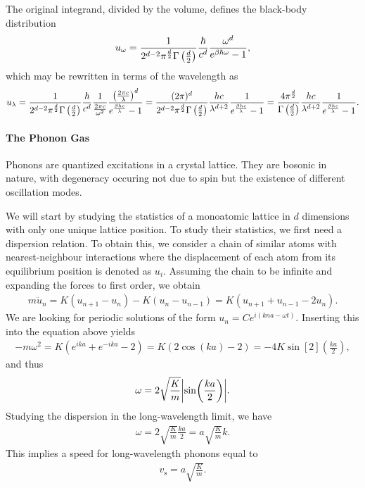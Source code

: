 The original integrand, divided by the volume, defines the black-body distribution
\begin{align*}
	u_{\omega} = \frac{1}{2^{d - 2}\pi^{\frac{d}{2}}\Gamma\left(\frac{d}{2}\right)}\frac{\hbar}{c^{d}}\frac{\omega^{d}}{e^{\beta\hbar\omega} - 1},
\end{align*}
which may be rewritten in terms of the wavelength as
\begin{align*}
	u_{\lambda} = \frac{1}{2^{d - 2}\pi^{\frac{d}{2}}\Gamma\left(\frac{d}{2}\right)}\frac{\hbar}{c^{d}}\frac{1}{\frac{2\pi c}{\omega^{2}}}\frac{\left(\frac{2\pi c}{\lambda}\right)^{d}}{e^{\frac{\beta hc}{\lambda}} - 1} = \frac{(2\pi)^{d}}{2^{d - 2}\pi^{\frac{d}{2}}\Gamma\left(\frac{d}{2}\right)}\frac{hc}{\lambda^{d + 2}}\frac{1}{e^{\frac{\beta hc}{\lambda}} - 1} = \frac{4\pi^{\frac{d}{2}}}{\Gamma\left(\frac{d}{2}\right)}\frac{hc}{\lambda^{d + 2}}\frac{1}{e^{\frac{\beta hc}{\lambda}} - 1}.
\end{align*}

\paragraph{The Phonon Gas}
Phonons are quantized excitations in a crystal lattice. They are bosonic in nature, with degeneracy occuring not due to spin but the existence of different oscillation modes.

We will start by studying the statistics of a monoatomic lattice in $d$ dimensions with only one unique lattice position. To study their statistics, we first need a dispersion relation. To obtain this, we consider a chain of similar atoms with nearest-neighbour interactions where the displacement of each atom from its equilibrium position is denoted as $u_{i}$. Assuming the chain to be infinite and expanding the forces to first order, we obtain
\begin{align*}
	m\ddot{u}_{n} = K(u_{n + 1} - u_{n}) - K(u_{n} - u_{n - 1}) = K(u_{n + 1} + u_{n - 1} - 2u_{n}).
\end{align*}
We are looking for periodic solutions of the form $u_{n} = Ce^{i(kna - \omega t)}$. Inserting this into the equation above yields
\begin{align*}
	-m\omega^{2} = K(e^{ika} + e^{-ika} - 2) = K(2\cos(ka) - 2) = -4K\sin[2](\frac{ka}{2}),
\end{align*}
and thus
\begin{align*}
	\omega = 2\sqrt{\frac{K}{m}}\abs{\sin(\frac{ka}{2})}.
\end{align*}
Studying the dispersion in the long-wavelength limit, we have
\begin{align*}
	\omega = 2\sqrt{\frac{K}{m}}\frac{ka}{2} = a\sqrt{\frac{K}{m}}k.
\end{align*}
This implies a speed for long-wavelength phonons equal to
\begin{align*}
	v_{\text{s}} = a\sqrt{\frac{K}{m}}.
\end{align*}

